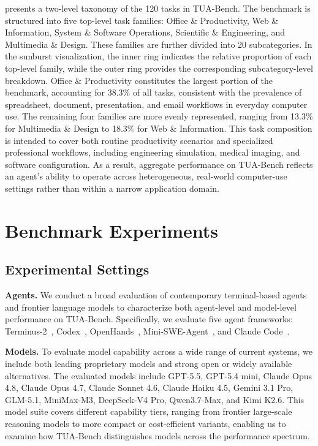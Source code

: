 \documentclass{llmxive}
\providecommand{\benchname}{\mbox{TUA-Bench}\xspace}
\begin{document}
 presents a two-level taxonomy of the 120 tasks in TUA-Bench. The benchmark is structured into five top-level task families: Office \& Productivity, Web \& Information, System \& Software Operations, Scientific \& Engineering, and Multimedia \& Design. These families are further divided into 20 subcategories. In the sunburst visualization, the inner ring indicates the relative proportion of each top-level family, while the outer ring provides the corresponding subcategory-level breakdown. Office \& Productivity constitutes the largest portion of the benchmark, accounting for 38.3\% of all tasks, consistent with the prevalence of spreadsheet, document, presentation, and email workflows in everyday computer use. The remaining four families are more evenly represented, ranging from 13.3\% for Multimedia \& Design to 18.3\% for Web \& Information. This task composition is intended to cover both routine productivity scenarios and specialized professional workflows, including engineering simulation, medical imaging, and software configuration. As a result, aggregate performance on TUA-Bench reflects an agent's ability to operate across heterogeneous, real-world computer-use settings rather than within a narrow application domain.


\section{Benchmark Experiments}\label{sec:results}

\subsection{Experimental Settings}
\noindent\textbf{Agents.}
We conduct a broad evaluation of contemporary terminal-based agents and frontier language models to characterize both agent-level and model-level performance on \benchname. Specifically, we evaluate five agent frameworks: Terminus-2~\citep{harbor_terminus2}, Codex~\citep{openai2025codex}, OpenHands~\citep{wang2025openhands}, Mini-SWE-Agent~\citep{yang2024swe}, and Claude Code~\citep{anthropic2026claudecode}. 

\noindent\textbf{Models.}
To evaluate model capability across a wide range of current systems, we include both leading proprietary models and strong open or widely available alternatives. The evaluated models include GPT-5.5, GPT-5.4 mini, Claude Opus 4.8, Claude Opus 4.7, Claude Sonnet 4.6, Claude Haiku 4.5, Gemini 3.1 Pro, GLM-5.1, MiniMax-M3, DeepSeek-V4 Pro, Qwen3.7-Max, and Kimi K2.6. This model suite covers different capability tiers, ranging from frontier large-scale reasoning models to more compact or cost-efficient variants, enabling us to examine how \benchname distinguishes models across the performance spectrum.
\end{document}
